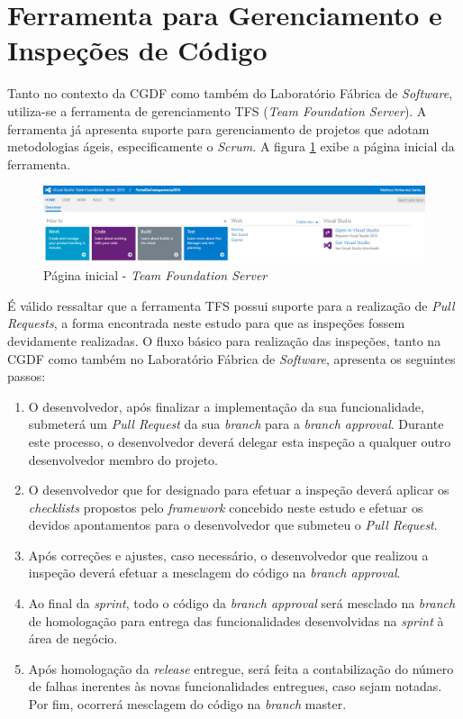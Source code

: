 \section{Ferramenta para Gerenciamento e Inspeções de Código}

Tanto no contexto da CGDF como também do Laboratório Fábrica de \textit{Software}, utiliza-se a ferramenta de gerenciamento TFS (\textit{Team Foundation Server}). A ferramenta já apresenta suporte para gerenciamento de projetos que adotam metodologias ágeis, especificamente o \textit{Scrum}. A figura \ref{fig:tfs} exibe a página inicial da ferramenta.

\begin{figure}[h]
\includegraphics[width=\textwidth]{figuras/tfs.png}
\caption{Página inicial - \textit{Team Foundation Server}}
\label{fig:tfs}
\end{figure}

É válido ressaltar que a ferramenta TFS possui suporte para a realização de \textit{Pull Requests}, a forma encontrada neste estudo para que as inspeções fossem devidamente realizadas. O fluxo básico para realização das inspeções, tanto na CGDF como também no Laboratório Fábrica de \textit{Software}, apresenta os seguintes passos:

\begin{enumerate}
	\item O desenvolvedor, após finalizar a implementação da sua funcionalidade, submeterá um \textit{Pull Request} da sua \textit{branch} para a \textit{branch approval}. Durante este processo, o desenvolvedor deverá delegar esta inspeção a qualquer outro desenvolvedor membro do projeto.

	\item O desenvolvedor que for designado para efetuar a inspeção deverá aplicar os \textit{checklists} propostos pelo \textit{framework} concebido neste estudo e efetuar os devidos apontamentos para o desenvolvedor que submeteu o \textit{Pull Request}.

	\item Após correções e ajustes, caso necessário, o desenvolvedor que realizou a inspeção deverá efetuar a mesclagem do código na \textit{branch approval}.

	\item Ao final da \textit{sprint}, todo o código da \textit{branch approval} será mesclado na \textit{branch} de homologação para entrega das funcionalidades desenvolvidas na \textit{sprint} à área de negócio.

	\item Após homologação da \textit{release} entregue, será feita a contabilização do número de falhas inerentes às novas funcionalidades entregues, caso sejam notadas. Por fim, ocorrerá mesclagem do código na \textit{branch} master.
\end{enumerate}

